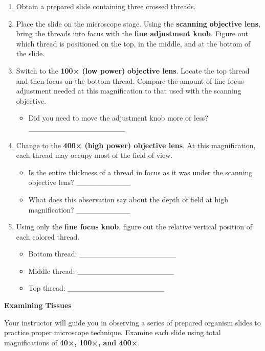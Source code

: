 \documentclass[
  letterpaper,
  DIV=11,
  numbers=noendperiod]{scrreprt}
\providecommand{\tightlist}{%
  \setlength{\itemsep}{0pt}\setlength{\parskip}{0pt}}
\begin{document}
\begin{enumerate}
\def\labelenumi{\arabic{enumi}.}
\item
  Obtain a prepared slide containing three crossed threads.
\item
  Place the slide on the microscope stage. Using the \textbf{scanning}
  \textbf{objective lens}, bring the threads into focus with the
  \textbf{fine adjustment knob}. Figure out which thread is positioned
  on the top, in the middle, and at the bottom of the slide.
\item
  Switch to the \textbf{100× (low power)} \textbf{objective lens}.
  Locate the top thread and then focus on the bottom thread. Compare the
  amount of fine focus adjustment needed at this magnification to that
  used with the scanning objective.

  \begin{itemize}
  \tightlist
  \item
    Did you need to move the adjustment knob more or less?
    \_\_\_\_\_\_\_\_\_\_\_\_\_\_\_\_\_\_
  \end{itemize}
\item
  Change to the \textbf{400× (high power) objective lens}. At this
  magnification, each thread may occupy most of the field of view.

  \begin{itemize}
  \item
    Is the entire thickness of a thread in focus as it was under the
    scanning objective lens? \_\_\_\_\_\_\_\_\_\_
  \item
    What does this observation say about the depth of field at high
    magnification? \_\_\_\_\_\_\_\_\_\_
  \end{itemize}
\item
  Using only the \textbf{fine focus knob}, figure out the relative
  vertical position of each colored thread.

  \begin{itemize}
  \item
    Bottom thread: \_\_\_\_\_\_\_\_\_\_\_\_\_\_\_\_\_\_
  \item
    Middle thread: \_\_\_\_\_\_\_\_\_\_\_\_\_\_\_\_\_\_
  \item
    Top thread: \_\_\_\_\_\_\_\_\_\_\_\_\_\_\_\_\_\_
  \end{itemize}
\end{enumerate}

\textbf{Examining Tissues}

Your instructor will guide you in observing a series of prepared
organism slides to practice proper microscope technique. Examine each
slide using total magnifications of \textbf{40×, 100×, and 400×}.
\end{document}
